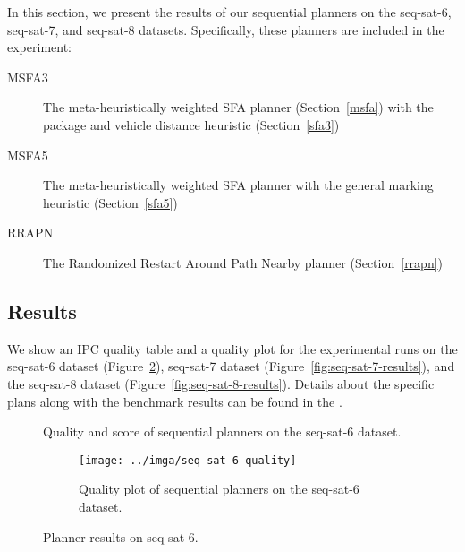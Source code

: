 In this section, we present the results of our sequential planners on the seq-sat-6, seq-sat-7, and seq-sat-8 datasets. Specifically, these planners are included in the experiment:
\begin{description}
\item[MSFA3] The meta-heuristically weighted SFA planner (Section~\ref{msfa}) with the package and vehicle distance heuristic (Section~\ref{sfa3})
\item[MSFA5] The meta-heuristically weighted SFA planner with the general marking heuristic (Section~\ref{sfa5})
\item[RRAPN] The Randomized Restart Around Path Nearby planner (Section~\ref{rrapn})
\end{description}

\subsection{Results}\label{sequential-results}

We show an IPC quality table and a quality plot
for the experimental runs on the seq-sat-6 dataset (Figure~\ref{fig:seq-sat-6-results}), seq-sat-7 dataset (Figure~\ref{fig:seq-sat-7-results}), and the seq-sat-8 dataset (Figure~\ref{fig:seq-sat-8-results}). Details about the specific plans along with the benchmark results can be found in the .

\begin{figure}[tbp]
\centering
\begin{subtable}{\textwidth}
\centering
\scriptsize
\renewcommand{\footnotesize}{\scriptsize}

\caption{Quality and score of sequential planners on the seq-sat-6 dataset.}
\label{tab:seq-sat-6-ipc-scores}
\end{subtable}

\vspace{0.5cm}
\begin{subfigure}{\textwidth}
\centering
\texttt{[image: ../imga/seq-sat-6-quality]}
\caption{Quality plot of sequential planners on the seq-sat-6 dataset.}
\label{fig:seq-sat-6-quality}
\end{subfigure}
\caption{Planner results on seq-sat-6.}
\label{fig:seq-sat-6-results}
\end{figure}

